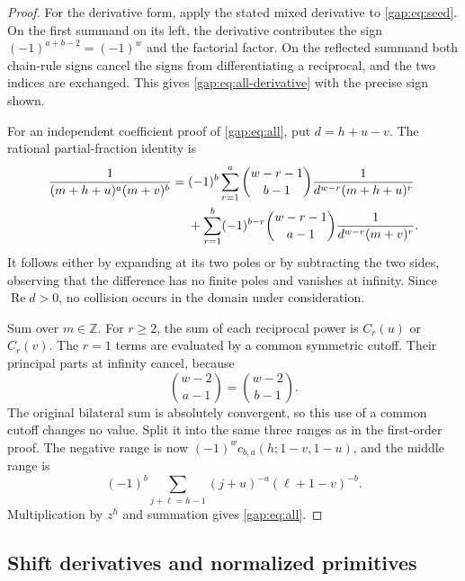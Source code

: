 \begin{proof}
For the derivative form, apply the stated mixed derivative to
\eqref{gap:eq:seed}. On the first summand on its left, the derivative
contributes the sign $(-1)^{a+b-2}=(-1)^w$ and the factorial factor.
On the reflected summand both chain-rule signs cancel the signs
from differentiating a reciprocal, and the two indices are exchanged.
This gives \eqref{gap:eq:all-derivative} with the precise sign shown.

For an independent coefficient proof of \eqref{gap:eq:all}, put
$d=h+u-v$. The rational partial-fraction identity is
\begin{align}
 \frac1{(m+h+u)^a(m+v)^b}
 ={}&(-1)^b\sum_{r=1}^{a}
  \binom{w-r-1}{b-1}\frac1{d^{w-r}(m+h+u)^r}\notag\\
 &+\sum_{r=1}^{b}(-1)^{b-r}
  \binom{w-r-1}{a-1}\frac1{d^{w-r}(m+v)^r}.
 \label{gap:eq:pf}
\end{align}
It follows either by expanding at its two poles or by subtracting
the two sides, observing that the difference has no finite poles and
vanishes at infinity. Since $\operatorname{Re}d>0$, no collision occurs
in the domain under consideration.

Sum over $m\in\mathbb Z$. For $r\geq2$, the sum of each reciprocal
power is $C_r(u)$ or $C_r(v)$. The $r=1$ terms are evaluated by a
common symmetric cutoff. Their principal parts at infinity cancel,
because
\[
 \binom{w-2}{a-1}=\binom{w-2}{b-1}.
\]
The original bilateral sum is absolutely convergent, so this use of
a common cutoff changes no value. Split it into the same three ranges
as in the first-order proof. The negative range is now
$(-1)^w c_{b,a}(h;1-v,1-u)$, and the middle range is
\[
 (-1)^b\sum_{j+\ell=h-1}
      (j+u)^{-a}(\ell+1-v)^{-b}.
\]
Multiplication by $z^h$ and summation gives
\eqref{gap:eq:all}.
\end{proof}

\subsection{Shift derivatives and normalized primitives}

